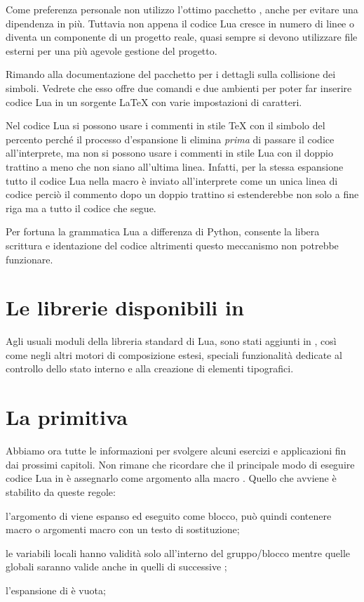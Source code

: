 Come preferenza personale non utilizzo l'ottimo pacchetto ,
anche per evitare una dipendenza in più. Tuttavia non appena il codice Lua
cresce in numero di linee o diventa un componente di un progetto reale, quasi
sempre si devono utilizzare file esterni per una più agevole gestione del
progetto.

Rimando alla documentazione del pacchetto  per i dettagli sulla
collisione dei simboli. Vedrete che esso offre due comandi e due ambienti per
poter far inserire codice Lua in un sorgente \LaTeX{} con varie impostazioni di
caratteri.

Nel codice Lua si possono usare i commenti in stile \TeX{} con il simbolo del
percento perché il processo d'espansione li elimina \emph{prima} di passare il
codice all'interprete, ma non si possono usare i commenti in stile Lua con il
doppio trattino a meno che non siano all'ultima linea. Infatti, per la stessa
espansione tutto il codice Lua nella macro  è inviato
all'interprete come un unica linea di codice perciò il commento dopo un doppio
trattino si estenderebbe non solo a fine riga ma a tutto il codice che segue.

Per fortuna la grammatica Lua a differenza di Python, consente la libera
scrittura e identazione del codice altrimenti questo meccanismo non potrebbe
funzionare.


\section{Le librerie disponibili in \LuaTeX}

Agli usuali moduli della libreria standard di Lua, sono stati aggiunti in
\LuaTeX{}, così come negli altri motori di composizione estesi, speciali
funzionalità dedicate al controllo dello stato interno e alla creazione di
elementi tipografici.





\section{La primitiva }

Abbiamo ora tutte le informazioni per svolgere alcuni esercizi e applicazioni
fin dai prossimi capitoli. Non rimane che ricordare che il principale modo di
eseguire codice Lua in \LuaTeX{} è assegnarlo come argomento alla macro
. Quello che avviene è stabilito da queste regole:
\begin{compactenumerate}
\item l'argomento di  viene espanso ed eseguito come blocco, può
quindi contenere macro o argomenti macro con un testo di sostituzione;

\item le variabili locali hanno validità solo all'interno del gruppo/blocco
mentre quelle globali saranno valide anche in quelli di successive
;

\item l'espansione di  è vuota;
\end{compactenumerate}


